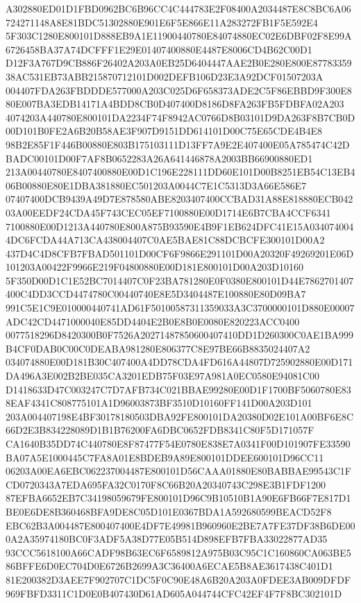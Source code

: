 \documentclass[UTF8,fontset=fandol,zihao=-4,a4paper]{ctexart}
\begin{document}
{{A302880ED01D1FBD0962BC6B96CC4C444783E2F08400A2034487E8C8BC6A06724271148A8E81BDC51302880E901E6F5E866E11A283272FB1F5E592E4
5F303C1280E800101D888EB9A1E11900440780E84074880EC02E6DBF02F8E99A6726458BA37A74DCFFF1E29E01407400880E4487E8006CD4B62C00D1
D12F3A767D9CB886F26402A203A0EB25D6404447AAE2B0E280E800E8778335938AC531EB73ABB215870712101D002DEFB106D23E3A92DCF01507203A
004407FDA263FBDDDE577000A203C025D6F658373ADE2C5F86EBBD9F300E880E007BA3EDB14171A4BDD8CB0D407400D8186D8FA263FB5FDBFA02A203
4074203A440780E800101DA2234F74F8942AC0766D8B03101D9DA263F8B7CB0D00D101B0FE2A6B20B58AE3F907D9151DD614101D00C75E65CDE4B4E8
98B2E85F1F446B00880E803B175103111D13FF7A9E2E407400E05A785474C42DBADC00101D00F7AF8B0652283A26A641446878A2003BB66900880ED1
213A00440780E8407400880E00D1C196E228111DD60E101D00B8251EB54C13EB406B00880E80E1DBA381880EC501203A0044C7E1C5313D3A66E586E7
07407400DCB9439A49D7E878580ABE8203407400CCBAD31A88E818880ECB04203A00EEDF24CDA45F743CEC05EF7100880E00D1714E6B7CBA4CCF6341
7100880E00D1213A440780E800A875B93590E4B9F1EB624DFC41E15A0340740044DC6FCDA44A713CA438004407C0AE5BAE81C88DCBCFE300101D00A2
437D4C4D8CFB7FBAD501101D00CF6F9866E291101D00A20320F49269201E06D101203A00422F9966E219F04800880E00D181E800101D00A203D10160
5F350D00D1C1E52BC7014407C0F23BA781280E0F0380E800101D44E7862701407400C4DD3CCD4474780C00440740E8E5D3404487E100880E80D09BA7
991C5E1C9E010000440741AD61F50100587311359033A3C3700000101D880E00007ADC42CD4471000040E85DD4404E2B0E8B0E0080E820223ACC0400
0077518296D8420300B0F7526A20271487850600407410DD1D260300C0AE1BA999B4CF0DAB0C00C0DEABA981280E806377C8E97BE66B8835024407A2
034074880E00D181B30C407400A4DD78CDA4FD616A44807D725902880E00D171DA496A3E002B2BE035CA3201EDB75F03E97A981A0EC0580E94081C00
D1418633D47C003247C7D7AFB734C021BBAE99280E00D1F1700BF5060780E838EAF4341C808775101A1D96003873BF3510D10160FF141D00A203D101
203A004407198E4BF30178180503DBA92FE800101DA20380D02E101A00BF6E8C66D2E3B834228089D1B1B76200FA6DBC0652FDB8341C80F5D171057F
CA1640B35DD74C440780E8F87477F54E0780E838E7A0341F00D101907FE33590BA07A5E1000445C7FA8A01E8BDEB9A89E800101DDEE600101D96CC11
06203A00EA6EBC062237004487E800101D56CAAA01880E80BABBAE99543C1FCD0720343A7EDA695FA32C0170F8C66B20A20340743C298E3B1FDF1200
87EFBA6652EB7C34198059679FE800101D96C9B10510B1A90E6FB66F7E817D1BE0E6DE8B360468BFA9DE8C05D101E0367BDA1A592680599BEACD52F8
EBC62B3A004487E800407400E4DF7E49981B960960E2BE7A7FE37DF38B6DE000A2A35974180BC0F3ADF5A38D77E05B514D898EFB7FBA33022877AD35
93CCC5618100A66CADF98B63EC6F6589812A975B03C95C1C160860CA063BE586BFFE6D0EC704D0E6726B2699A3C36400A6ECAE5B8AE3617438C401D1
81E200382D3AEE7F902707C1DC5F0C90E48A6B20A203A0FDEE3AB009DFDF969FBFD3311C1D0E0B407430D61AD605A044744CFC42EF4F7F8BC302101D
}}
\end{document}
